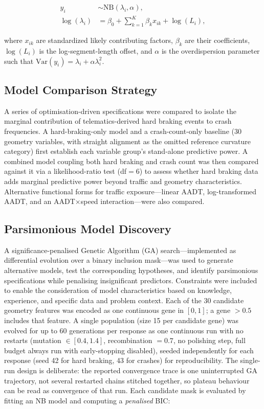 \documentclass[letterpaper,8pt]{extarticle}  %
\begin{document}
\begin{doublespacing}
\begin{linenumbers}
\begin{align}
    y_i &\sim \text{NB}(\lambda_i, \alpha), \label{eq:nbmodel}\\
    \log(\lambda_i) &= \beta_0 + \sum_{k=1}^{K} \beta_k x_{ik} + \log(L_i), \label{eq:nblinpred}
\end{align}

where $x_{ik}$ are standardized likely contributing factors, $\beta_k$ are their coefficients, $\log(L_i)$ is the log-segment-length offset, and $\alpha$ is the overdispersion parameter such that $\text{Var}(y_i) = \lambda_i + \alpha\lambda_i^2$.

\subsection{Model Comparison Strategy}\label{sec:model-comparison}

A series of optimisation-driven specifications were compared to isolate the marginal contribution of telematics-derived hard braking events to crash frequencies. A hard-braking-only model and a crash-count-only baseline (30 geometry variables, with straight alignment as the omitted reference curvature category) first establish each variable group's stand-alone predictive power. A combined model coupling both hard braking and crash count was then compared against it via a likelihood-ratio test (df$=6$) to assess whether hard braking data adds marginal predictive power beyond traffic and geometry characteristics. Alternative functional forms for traffic exposure---linear AADT, log-transformed AADT, and an AADT$\times$speed interaction---were also compared. 

\subsection{Parsimonious Model Discovery}\label{sec:de-method}

A significance-penalised Genetic Algorithm (GA) search---implemented as differential evolution over a binary inclusion mask---was used to generate alternative models, test the corresponding hypotheses, and identify parsimonious specifications while penalising insignificant predictors. Constraints were included to enable the consideration of model characteristics based on knowledge, experience, and specific data and problem context. Each of the 30 candidate geometry features was encoded as one continuous gene in $[0,1]$; a gene $>0.5$ includes that feature. A single population (size 15 per candidate gene) was evolved for up to 60 generations per response as one continuous run with no restarts (mutation $\in [0.4, 1.4]$, recombination $=0.7$, no polishing step, full budget always run with early-stopping disabled), seeded independently for each response (seed 42 for hard braking, 43 for crashes) for reproducibility. The single-run design is deliberate: the reported convergence trace is one uninterrupted GA trajectory, not several restarted chains stitched together, so plateau behaviour can be read as convergence of that run. Each candidate mask is evaluated by fitting an NB model and computing a \textit{penalised} BIC:


\end{linenumbers}
\end{doublespacing}
\end{document}
